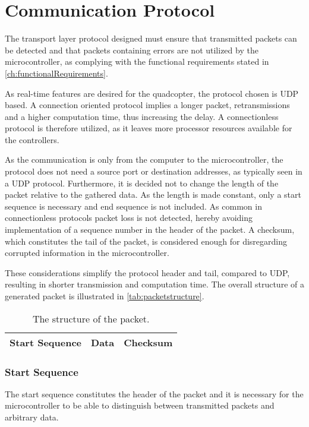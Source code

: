 \section{Communication Protocol}
The transport layer protocol designed must ensure that transmitted packets can be detected and that packets containing errors are not utilized by the microcontroller, as complying with the functional requirements stated in \autoref{ch:functionalRequirements}.

As real-time features are desired for the quadcopter, the protocol chosen is UDP based. A connection oriented protocol implies a longer packet, retransmissions and a higher computation time, thus increasing the delay. A connectionless protocol is therefore utilized, as it leaves more processor resources available for the controllers.

As the communication is only from the computer to the microcontroller, the protocol does not need a source port or destination addresses, as typically seen in a UDP protocol. Furthermore, it is decided not to change the length of the packet relative to the gathered data. As the length is made constant, only a start sequence is necessary and end sequence is not included. As common in connectionless protocols packet loss is not detected, hereby avoiding implementation of a sequence number in the header of the packet. A checksum, which constitutes the tail of the packet, is considered enough for disregarding corrupted information in the microcontroller.

These considerations simplify the protocol header and tail, compared to UDP, resulting in shorter transmission and computation time. The overall structure of a generated packet is illustrated in \autoref{tab:packetstructure}.

\begin{table}[H]\centering
\begin{tabular}{|>{\centering\arraybackslash}m{3cm}|>{\centering\arraybackslash}m{2cm}|>{\centering\arraybackslash}m{2cm}|}
\hline
Start Sequence & Data & Checksum \\
\hline
\end{tabular}
\caption{The structure of the packet.}
\label{tab:packetstructure}
\end{table}

\subsubsection{Start Sequence}
The start sequence constitutes the header of the packet and it is necessary for the microcontroller to be able to distinguish between transmitted packets and arbitrary data. 
 
